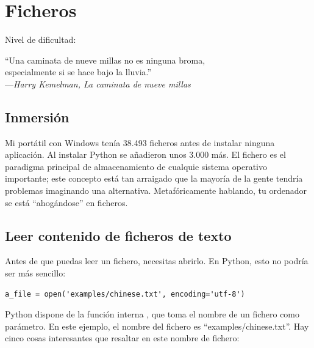 
\chapter{Ficheros}\label{ch:ficheros}

\noindent
Nivel de dificultad:\diflll

\begin{citaCap}
``Una caminata de nueve millas no es ninguna broma, \\
especialmente si se hace bajo la lluvia.'' \\
---\emph{Harry Kemelman, La caminata de nueve millas}
\end{citaCap}

\section{Inmersión}

Mi portátil con Windows tenía 38.493 ficheros antes de instalar ninguna aplicación. Al instalar Python se añadieron unos 3.000 más. El fichero es el paradigma principal de almacenamiento de cualquie sistema operativo importante; este concepto está tan arraigado que la mayoría de la gente tendría problemas imaginando una alternativa. Metafóricamente hablando, tu ordenador se está ``ahogándose'' en ficheros.

\section{Leer contenido de ficheros de texto}

Antes de que puedas leer un fichero, necesitas abrirlo. En Python, esto no podría ser más sencillo:

\noindent\begin{minipage}{\textwidth}
\begin{lstlisting}[mathescape=True]
a_file = open('examples/chinese.txt', encoding='utf-8')
\end{lstlisting}
\end{minipage}

Python dispone de la función interna , que toma el nombre de un fichero como parámetro. En este ejemplo, el nombre del fichero es ``examples/chinese.txt''. Hay cinco cosas interesantes que resaltar en este nombre de fichero:

